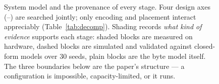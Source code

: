 \begin{figure}[t]
{\begin{tikzpicture}
\end{tikzpicture}}
\caption{System model and the provenance of every stage. Four design axes
(--) are
searched jointly; only encoding and placement interact appreciably
(Table~\ref{tab:decomp}). Shading records \emph{what kind of evidence} supports each stage: shaded
blocks are measured on hardware, dashed blocks are simulated and validated against closed-form
models over 30 seeds, plain blocks are the byte model itself. The three boundaries below are the
paper's structure --- a configuration is impossible, capacity-limited, or it runs.}
\label{fig:system}
\end{figure}
